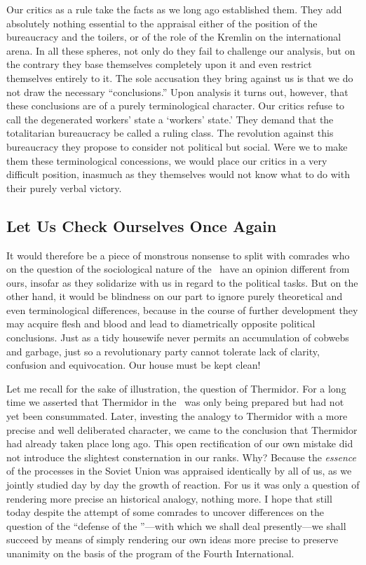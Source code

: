 Our critics as a rule take the facts as we long ago established them. They add absolutely nothing essential to the appraisal either of the position of the bureaucracy and the toilers, or of the role of the Kremlin on the international arena. In all these spheres, not only do they fail to challenge our analysis, but on the contrary they base themselves completely upon it and even restrict themselves entirely to it. The sole accusation they bring against us is that we do not draw the necessary “conclusions.” Upon analysis it turns out, however, that these conclusions are of a purely terminological character. Our critics refuse to call the degenerated workers’ state a `workers’ state.' They demand that the totalitarian bureaucracy be called a ruling class. The revolution against this bureaucracy they propose to consider not political but social. Were we to make them these terminological concessions, we would place our critics in a very difficult position, inasmuch as they themselves would not know what to do with their purely verbal victory.

\subsection*{Let Us Check Ourselves Once Again}

It would therefore be a piece of monstrous nonsense to split with comrades who on the question of the sociological nature of the \USSR\ have an opinion different from ours, insofar as they solidarize with us in regard to the political tasks. But on the other hand, it would be blindness on our part to ignore purely theoretical and even terminological differences, because in the course of further development they may acquire flesh and blood and lead to diametrically opposite political conclusions. Just as a tidy housewife never permits an accumulation of cobwebs and garbage, just so a revolutionary party cannot tolerate lack of clarity, confusion and equivocation. Our house must be kept clean!

Let me recall for the sake of illustration, the question of Thermidor. For a long time we asserted that Thermidor in the \USSR\ was only being prepared but had not yet been consummated. Later, investing the analogy to Thermidor with a more precise and well deliberated character, we came to the conclusion that Thermidor had already taken place long ago. This open rectification of our own mistake did not introduce the slightest consternation in our ranks. Why? Because the \emph{essence} of the processes in the Soviet Union was appraised identically by all of us, as we jointly studied day by day the growth of reaction. For us it was only a question of rendering more precise an historical analogy, nothing more. I hope that still today despite the attempt of some comrades to uncover differences on the question of the “defense of the \USSR”---with which we shall deal presently---we shall succeed by means of simply rendering our own ideas more precise to preserve unanimity on the basis of the program of the Fourth International.

